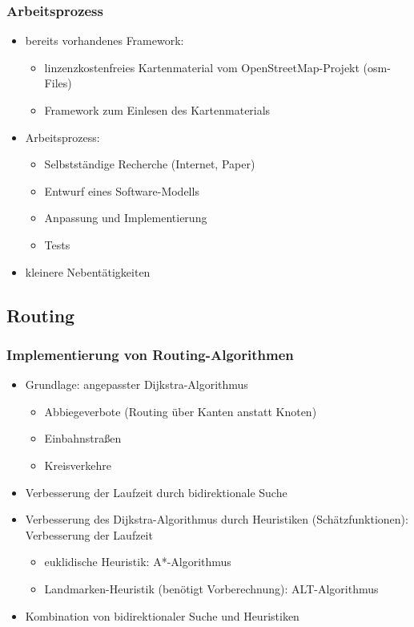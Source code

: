 \begin{frame}[t] \frametitle{Arbeitsprozess}
\vspace{0.5cm}
  \begin{itemize}
  \item bereits vorhandenes Framework:
    \begin{itemize}
    \item linzenzkostenfreies Kartenmaterial vom OpenStreetMap-Projekt (osm-Files)
    \item Framework zum Einlesen des Kartenmaterials
    \end{itemize}
  \item Arbeitsprozess:
    \begin{itemize}
    \item Selbstst\"andige Recherche (Internet, Paper)
    \item Entwurf eines Software-Modells
    \item Anpassung und Implementierung
    \item Tests
    \end{itemize}
  \item kleinere Nebent\"atigkeiten
  \end{itemize}
\end{frame}

\subsection{Routing}
\begin{frame} \frametitle{Implementierung von Routing-Algorithmen}
  \begin{itemize}
    \item Grundlage: angepasster Dijkstra-Algorithmus
      \begin{itemize}
      \item Abbiegeverbote (Routing \"uber Kanten anstatt Knoten)
      \item Einbahnstra\ss en
      \item Kreisverkehre
      \end{itemize}
      \vspace{0.1cm}
    \item Verbesserung der Laufzeit durch bidirektionale Suche
      \vspace{0.1cm}
    \item Verbesserung des Dijkstra-Algorithmus durch Heuristiken (Sch\"atzfunktionen): Verbesserung der Laufzeit
      \begin{itemize}
      \item euklidische Heuristik: A*-Algorithmus
      \item Landmarken-Heuristik (ben\"otigt Vorberechnung): ALT-Algorithmus
      \end{itemize}
      \vspace{0.1cm}
    \item Kombination von bidirektionaler Suche und Heuristiken
  \end{itemize}
\end{frame}

